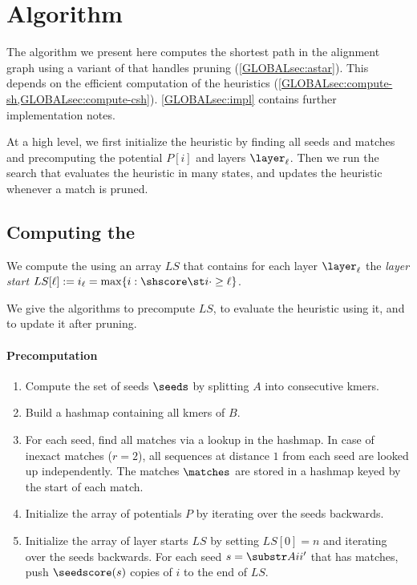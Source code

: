 \section{Algorithm} \label{GLOBALsec:computation}

\renewcommand\theenumi{\algletter\arabic{enumi}}
\renewcommand\labelenumi{{\rmfamily \algletter\arabic{enumi}.}}
\setlength{\leftmargini}{2em}

The algorithm we present here computes the shortest path in the alignment graph
using a variant of \A that handles pruning (\cref{GLOBALsec:astar}). This
depends on the efficient computation of the heuristics
(\cref{GLOBALsec:compute-sh,GLOBALsec:compute-csh}). \cref{GLOBALsec:impl}
contains further implementation notes.

At a high level, we first initialize the heuristic by finding all seeds and
matches and precomputing the potential $P[i]$ and layers $\layer_\ell$. Then we
run the \A search that evaluates the heuristic in many states, and updates the
heuristic whenever a match is pruned.

\subsection{Computing the \sh} \label{GLOBALsec:compute-sh}

We compute the \sh using an array $LS$
that contains for each layer $\layer_\ell$ the \emph{layer
start} $LS[\ell] := i_\ell = \max \{i : \shscore\st i\cdot \geq \ell\}$.

We give the algorithms to precompute $LS$, to evaluate the
heuristic using it, and to update it after pruning.

\paragraph{Precomputation}
\begin{samepage}
\newcommand{\algletter}{R}
\begin{enumerate}
  \item Compute the set of seeds $\seeds$ by splitting $A$ into consecutive kmers.
  \item Build a hashmap containing all kmers of $B$.
  \item For each seed, find all matches via a lookup in the hashmap.
        In case of inexact matches ($r=2$), all
        sequences at distance $1$ from each seed are looked up independently.
        The matches $\matches$ are stored in a hashmap keyed by the start
        of each match.
  \item Initialize the array of potentials $P$ by iterating over the seeds backwards.
  \item Initialize the array of layer starts $LS$ by setting $LS[0] = n$ and iterating over the
        seeds backwards. For each seed $s=\substr Ai{i'}$ that has matches,
        push $\seedscore(s)$ copies of $i$ to the end of
        $LS$.
\end{enumerate}
\end{samepage}

